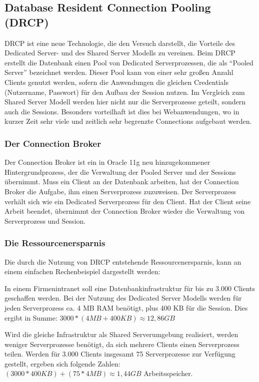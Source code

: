       \subsection{Database Resident Connection Pooling (DRCP)}
        DRCP ist eine neue Technologie, die den Versuch darstellt, die Vorteile des Dedicated Server- und des Shared Server Modells zu vereinen. Beim DRCP erstellt die Datenbank einen Pool von Dedicated Serverprozessen, die als \enquote{Pooled Server} bezeichnet werden. Dieser Pool kann von einer sehr großen Anzahl Clients genutzt werden, sofern die Anwendungen die gleichen Credentials (Nutzername, Passwort) für den Aufbau der Session nutzen. Im Vergleich zum Shared Server Modell werden hier nicht nur die Serverprozesse geteilt, sondern auch die Sessions. Besonders vorteilhaft ist dies bei Webanwendungen, wo in kurzer Zeit sehr viele und zeitlich sehr begrenzte Connections aufgebaut werden.


        \subsubsection{Der Connection Broker}
          Der Connection Broker ist ein in Oracle 11g neu hinzugekommener Hintergrundprozess, der die Verwaltung der Pooled Server und der Sessions übernimmt. Muss ein Client an der Datenbank arbeiten, hat der Connection Broker die Aufgabe, ihm einen Serverprozess zuzuweisen. Der Serverprozess verhält sich wie ein Dedicated Serverprozess für den Client. Hat der Client seine Arbeit beendet, übernimmt der Connection Broker wieder die Verwaltung von Serverprozess und Session.
        \subsubsection{Die Ressourcenersparnis}
          Die durch die Nutzung von DRCP entstehende Ressourcenersparnis, kann an einem einfachen Rechenbeispiel dargestellt werden:

          In einem Firmenintranet soll eine Datenbankinfrastruktur für bis zu 3.000 Clients geschaffen werden. Bei der Nutzung des Dedicated Server Modells werden für jeden Serverprozess ca. 4 MB RAM benötigt, plus 400 KB für die Session. Dies ergibt in Summe: $3000 * (4MB + 400KB) \approx 12,86 GB$

          Wird die gleiche Infrastruktur als Shared Serverumgebung realisiert, werden weniger Serverprozesse benötigt, da sich mehrere Clients einen Serverprozess teilen. Werden für 3.000 Clients insgesamt 75 Serverprozesse zur Verfügung gestellt, ergeben sich folgende Zahlen: $(3000 * 400 KB) + (75 * 4 MB) \approx 1,44 GB$ Arbeitsspeicher.


